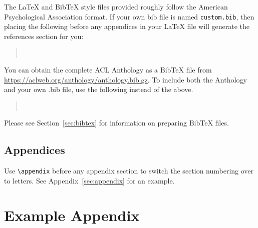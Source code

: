 \documentclass[11pt]{article}
\begin{document}
The \LaTeX{} and Bib\TeX{} style files provided roughly follow the American Psychological Association format.
If your own bib file is named \texttt{custom.bib}, then placing the following before any appendices in your \LaTeX{} file will generate the references section for you:
\begin{quote}
\begin{verbatim}


\end{verbatim}
\end{quote}
You can obtain the complete ACL Anthology as a Bib\TeX{} file from \url{https://aclweb.org/anthology/anthology.bib.gz}.
To include both the Anthology and your own .bib file, use the following instead of the above.
\begin{quote}
\begin{verbatim}


\end{verbatim}
\end{quote}
Please see Section~\ref{sec:bibtex} for information on preparing Bib\TeX{} files.

\subsection{Appendices}

Use \verb|\appendix| before any appendix section to switch the section numbering over to letters. See Appendix~\ref{sec:appendix} for an example.





\appendix

\section{Example Appendix}
\end{document}
